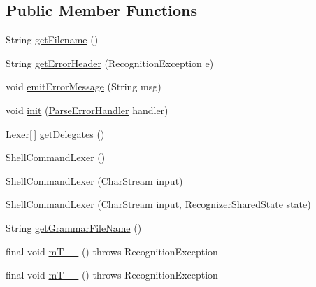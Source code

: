 \subsection*{Public Member Functions}
\begin{DoxyCompactItemize}
\item 
String \hyperlink{classorg_1_1tzi_1_1use_1_1parser_1_1shell_1_1_shell_command_lexer_a74f9ba7961f67c8a0de4edcb1ced6718}{get\-Filename} ()
\item 
String \hyperlink{classorg_1_1tzi_1_1use_1_1parser_1_1shell_1_1_shell_command_lexer_ab94de748bf5f1256d8e5cb4029f439be}{get\-Error\-Header} (Recognition\-Exception e)
\item 
void \hyperlink{classorg_1_1tzi_1_1use_1_1parser_1_1shell_1_1_shell_command_lexer_a77a996c045de7ceb76364de93a938b1b}{emit\-Error\-Message} (String msg)
\item 
void \hyperlink{classorg_1_1tzi_1_1use_1_1parser_1_1shell_1_1_shell_command_lexer_abc0656a63dc28b38dbd06c345eeca598}{init} (\hyperlink{classorg_1_1tzi_1_1use_1_1parser_1_1_parse_error_handler}{Parse\-Error\-Handler} handler)
\item 
Lexer\mbox{[}$\,$\mbox{]} \hyperlink{classorg_1_1tzi_1_1use_1_1parser_1_1shell_1_1_shell_command_lexer_aeaf592f04081c1ad3791e525320d47b8}{get\-Delegates} ()
\item 
\hyperlink{classorg_1_1tzi_1_1use_1_1parser_1_1shell_1_1_shell_command_lexer_a27dbce20f5a7f0584843184f939a2948}{Shell\-Command\-Lexer} ()
\item 
\hyperlink{classorg_1_1tzi_1_1use_1_1parser_1_1shell_1_1_shell_command_lexer_adac321a76e697293df9a1149d63dc148}{Shell\-Command\-Lexer} (Char\-Stream input)
\item 
\hyperlink{classorg_1_1tzi_1_1use_1_1parser_1_1shell_1_1_shell_command_lexer_a04e984cc08be4849c4a16166852ad76e}{Shell\-Command\-Lexer} (Char\-Stream input, Recognizer\-Shared\-State state)
\item 
String \hyperlink{classorg_1_1tzi_1_1use_1_1parser_1_1shell_1_1_shell_command_lexer_a4eb0f0d7b2428aa54fe78d4a646bd344}{get\-Grammar\-File\-Name} ()
\item 
final void \hyperlink{classorg_1_1tzi_1_1use_1_1parser_1_1shell_1_1_shell_command_lexer_aab3d81d91b797fc2fa7fb129e9d3a671}{m\-T\-\_\-\-\_} ()  throws Recognition\-Exception 
\item 
final void \hyperlink{classorg_1_1tzi_1_1use_1_1parser_1_1shell_1_1_shell_command_lexer_a8b86c7a6336f816685bdbbb054a8435c}{m\-T\-\_\-\-\_} ()  throws Recognition\-Exception 

\end{DoxyCompactItemize}
